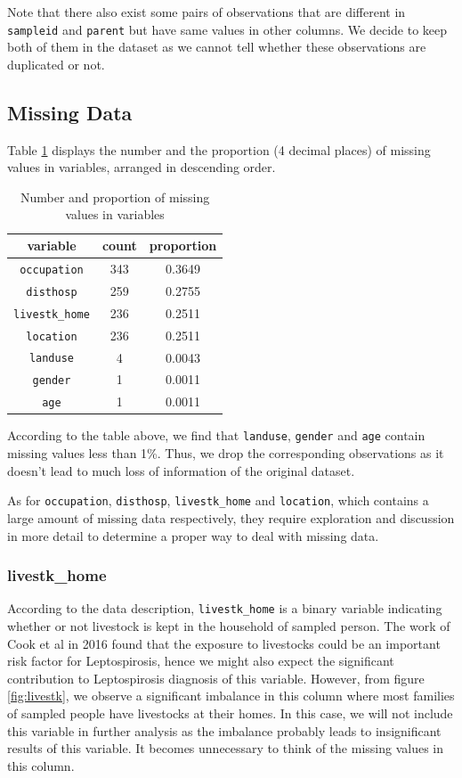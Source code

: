 \documentclass[11pt,twoside]{article}
\numberwithin{Theorem}{section}
\numberwithin{Definition}{section}
\numberwithin{Lemma}{section}
\numberwithin{Algorithm}{section}
\numberwithin{equation}{section}
\begin{document}
Note that there also exist some pairs of observations that are different in \texttt{sampleid} and \texttt{parent} but have same values in other columns. We decide to keep both of them in the dataset as we cannot tell whether these observations are duplicated or not.  

\subsection{Missing Data}

Table \ref{tab:missing} displays the number and the proportion (4 decimal places) of missing values in variables, arranged in descending order. 

\begin{table}[!h]
	\centering
	\begin{tabular}{|c|c|c|}
		\hline
		variable & count & proportion \\
		\hline
		\texttt{occupation} & 343 & 0.3649 \\ 
		\texttt{disthosp} &259 & 0.2755 \\
		\texttt{livestk\_home}  &  236 & 0.2511 \\
        \texttt{location}  &  236 & 0.2511 \\
		\texttt{landuse} & 4 & 0.0043 \\
		\texttt{gender} & 1 & 0.0011 \\
		\texttt{age} & 1 & 0.0011 \\
		\hline
	\end{tabular}
	\caption{Number and proportion of missing values in variables}
	\label{tab:missing}
\end{table}

According to the table above, we find that \texttt{landuse}, \texttt{gender} and \texttt{age} contain missing values less than 1\%. Thus, we drop the corresponding observations as it doesn't lead to much loss of information of the original dataset.

As for \texttt{occupation}, \texttt{disthosp}, \texttt{livestk\_home} and \texttt{location}, which contains a large amount of missing data respectively, they require exploration and discussion in more detail to determine a proper way to deal with missing data.

\subsubsection{livestk\_home}

According to the data description, \texttt{livestk\_home} is a binary variable indicating whether or not livestock is kept in the household of sampled person. The work of Cook et al in 2016 \cite{cook2016} found that the exposure to livestocks could be an important risk factor for Leptospirosis, hence we might also expect the significant contribution to Leptospirosis diagnosis of this variable. However, from figure \ref{fig:livestk}, we observe a significant imbalance in this column where most families of sampled people have livestocks at their homes. In this case, we will not include this variable in further analysis as the imbalance probably leads to insignificant results of this variable. It becomes unnecessary to think of the missing values in this column.
\end{document}
